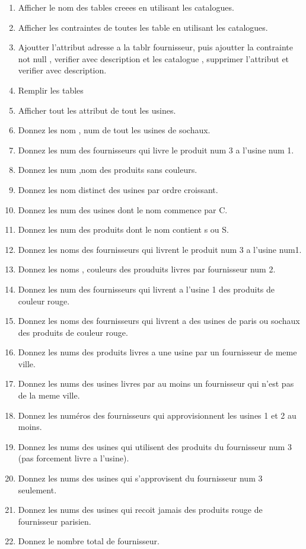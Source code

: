 \documentclass{article}
\begin{document}
\begin{enumerate}
\item Afficher le nom des tables creees en utilisant les catalogues.
\item Afficher les contraintes de toutes les table en utilisant les catalogues.
\item Ajoutter l'attribut adresse a la tablr fournisseur, puis ajoutter la contrainte not null ,
    verifier avec description et les catalogue , supprimer l'attribut et verifier avec description.
\item Remplir les tables
\item Afficher tout les attribut de tout les usines.
\item Donnez les nom , num de tout les usines de sochaux.
\item Donnez les num des fournisseurs qui livre le produit num 3 a l'usine num 1.
\item Donnez les num ,nom des produits sans couleurs.
\item Donnez les nom distinct des usines par ordre croissant.
\item Donnez les num des usines dont le nom commence par C.
\item Donnez les num des produits dont le nom contient s ou S.
\item Donnez les noms des fournisseurs qui livrent le produit num 3 a l'usine num1. 
\item Donnez les noms , couleurs des prouduits livres par fournisseur num 2.
\item Donnez les num des fournisseurs qui livrent a l'usine 1 des produits de couleur rouge.
\item Donnez les noms des fournisseurs qui livrent a des usines de paris ou sochaux des produits de couleur rouge.
\item Donnez les nums des produits livres a une usine par un fournisseur de meme ville.
\item Donnez les nums des usines livres par au moins un fournisseur qui n'est pas de la meme ville.
\item Donnez les numéros des fournisseurs qui approvisionnent les usines 1 et 2 au moins.
\item Donnez les nums des usines qui utilisent des produits du fournisseur num 3 (pas forcement livre a l'usine).
\item Donnez les nums des usines qui s'approvisent du fournisseur num 3 seulement. 
\item Donnez les nums des usines qui recoit jamais des produits rouge de fournisseur parisien.
\item Donnez le nombre total de fournisseur.

\end{enumerate}
\end{document}
